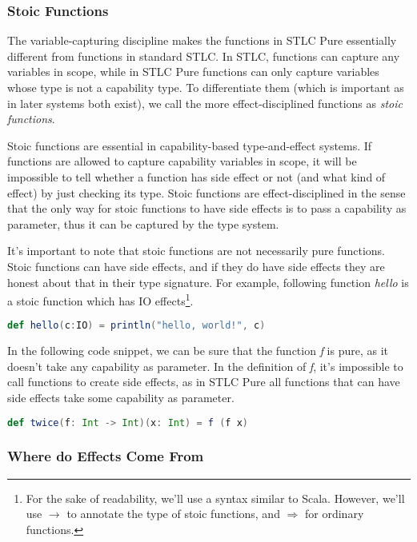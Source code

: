 \subsubsection{Stoic Functions}

The variable-capturing discipline makes the functions in STLC Pure
essentially different from functions in standard STLC. In STLC,
functions can capture any variables in scope, while in STLC Pure
functions can only capture variables whose type is not a capability
type. To differentiate them (which is important as in later systems
both exist), we call the more effect-disciplined functions as
\emph{stoic functions}.

Stoic functions are essential in capability-based type-and-effect
systems. If functions are allowed to capture capability variables in
scope, it will be impossible to tell whether a function has side
effect or not (and what kind of effect) by just checking its
type. Stoic functions are effect-disciplined in the sense that the
only way for stoic functions to have side effects is to pass a
capability as parameter, thus it can be captured by the type system.

It's important to note that stoic functions are not necessarily pure
functions. Stoic functions can have side effects, and if they do have
side effects they are honest about that in their type signature. For
example, following function \emph{hello} is a stoic function which has
IO effects\footnote{For the sake of readability, we'll use a syntax
  similar to Scala. However, we'll use $\to$ to annotate the type of
  stoic functions, and $\Rightarrow$ for ordinary functions.}.

\begin{lstlisting}[language=Scala]
  def hello(c:IO) = println("hello, world!", c)
\end{lstlisting}

In the following code snippet, we can be sure that the function
\emph{f} is pure, as it doesn't take any capability as parameter. In
the definition of \emph{f}, it's impossible to call functions to
create side effects, as in STLC Pure all functions that can have side
effects take some capability as parameter.

\begin{lstlisting}[language=Scala]
  def twice(f: Int -> Int)(x: Int) = f (f x)
\end{lstlisting}

\subsubsection{Where do Effects Come From}


